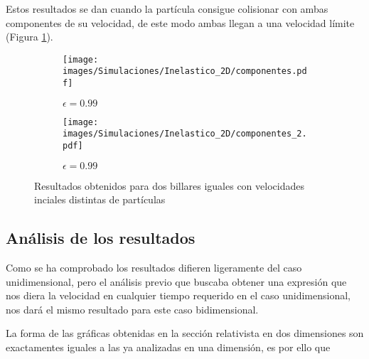  Estos resultados se dan cuando la partícula consigue colisionar con ambas componentes de su velocidad, de este modo ambas llegan a una velocidad límite (Figura \ref{fig:2DR_A-N1000_Ine_velocidades}).

\begin{figure}[H]
    \begin{subfigure}[b]{0.5\textwidth}
        \centering
        \texttt{[image: images/Simulaciones/Inelastico\_2D/componentes.pdf]}
        \caption{\( \epsilon = 0.99 \)}
    \end{subfigure}
    \hfill
    \begin{subfigure}[b]{0.5\textwidth}
        \centering
        \texttt{[image: images/Simulaciones/Inelastico\_2D/componentes\_2.pdf]}
        \caption{\( \epsilon = 0.99 \)}
    \end{subfigure}
    \caption{Resultados obtenidos para dos billares iguales con velocidades inciales distintas de partículas}
    \label{fig:2DR_A-N1000_Ine_velocidades}
\end{figure}

\subsection{Análisis de los resultados}

Como se ha comprobado los resultados difieren ligeramente del caso unidimensional, pero el análisis previo que buscaba obtener una expresión que nos diera la velocidad en cualquier tiempo requerido en el caso unidimensional, nos dará el mismo resultado para este caso bidimensional. 

\vspace{3mm}

La forma de las gráficas obtenidas en la sección relativista en dos dimensiones son exactamentes iguales a las ya analizadas en una dimensión, es por ello que 

